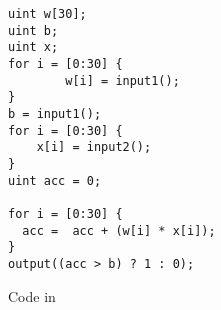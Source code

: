 \begin{figure}
\begin{verbatim}
uint w[30];
uint b;
uint x;
for i = [0:30] {
        w[i] = input1();
}
b = input1();
for i = [0:30] {
    x[i] = input2();
}
uint acc = 0;

for i = [0:30] {
  acc =  acc + (w[i] * x[i]);
}
output((acc > b) ? 1 : 0);
\end{verbatim}
\caption{Code in \tool}
\label{fig:ex-sml}
\end{figure}

